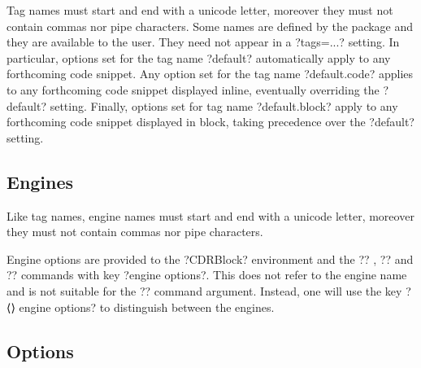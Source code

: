 \documentclass{article}
\begin{document}
Tag names must start and end with a unicode letter, moreover they must not contain commas nor pipe characters.
Some names are defined by the  package and they are available to the user. They need not appear in a \CDRCode[tags=src]?tags=...? setting. In particular, options set for the tag name \CDRCode[tags=src]?default? automatically apply to any forthcoming code snippet. Any option set for the tag name \CDRCode[tags=src]?default.code? applies to any forthcoming code snippet displayed inline, eventually overriding the \CDRCode[tags=src]?default? setting. Finally, options set for tag name \CDRCode[tags=src]?default.block? apply to any forthcoming code snippet displayed in block, taking precedence over the \CDRCode[tags=src]?default? setting.

\subsection{Engines}
Like tag names, engine names must start and end with a unicode letter, moreover they must not contain commas nor pipe characters.

Engine options are provided to the \CDRCode[tags=src]?CDRBlock? environment and the \CDRCode[tags=src]?\CDRCode? , \CDRCode[tags=src]?\CDRCodeUse? and \CDRCode[tags=src]?\CDRBlockUse? commands with key \CDRCode[tags=src]?engine options?. This does not refer to the engine name and is not suitable for the 
\CDRCode[tags=src]?\CDRSet? command argument.
Instead, one will use the key
\CDRCode[tags=src,mbox=false]?⟨\color{CDROptions}⟩ engine options? to distinguish between the engines.

\subsection{Options}
\label{sect:options}
\end{document}
